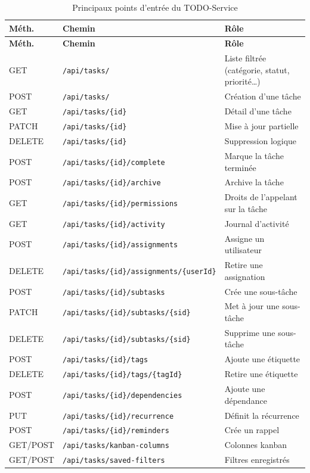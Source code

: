 \documentclass[11pt,a4paper,oneside]{report}
\newcommand{\code}[1]{\texttt{\small #1}}
\begin{document}
\begin{longtable}{@{}p{1.4cm}p{7.2cm}p{5.9cm}@{}}
\caption{Principaux points d'entrée du TODO-Service}\label{tab:ep-task}\\
\toprule
\textbf{Méth.} & \textbf{Chemin} & \textbf{Rôle} \\
\midrule
\endfirsthead
\toprule
\textbf{Méth.} & \textbf{Chemin} & \textbf{Rôle} \\
\midrule
\endhead
\bottomrule
\endlastfoot
GET & \code{/api/tasks/} & Liste filtrée (catégorie, statut, priorité…) \\
POST & \code{/api/tasks/} & Création d'une tâche \\
GET & \code{/api/tasks/\{id\}} & Détail d'une tâche \\
PATCH & \code{/api/tasks/\{id\}} & Mise à jour partielle \\
DELETE & \code{/api/tasks/\{id\}} & Suppression logique \\
POST & \code{/api/tasks/\{id\}/complete} & Marque la tâche terminée \\
POST & \code{/api/tasks/\{id\}/archive} & Archive la tâche \\
GET & \code{/api/tasks/\{id\}/permissions} & Droits de l'appelant sur la tâche \\
GET & \code{/api/tasks/\{id\}/activity} & Journal d'activité \\
POST & \code{/api/tasks/\{id\}/assignments} & Assigne un utilisateur \\
DELETE & \code{/api/tasks/\{id\}/assignments/\{userId\}} & Retire une assignation \\
POST & \code{/api/tasks/\{id\}/subtasks} & Crée une sous-tâche \\
PATCH & \code{/api/tasks/\{id\}/subtasks/\{sid\}} & Met à jour une sous-tâche \\
DELETE & \code{/api/tasks/\{id\}/subtasks/\{sid\}} & Supprime une sous-tâche \\
POST & \code{/api/tasks/\{id\}/tags} & Ajoute une étiquette \\
DELETE & \code{/api/tasks/\{id\}/tags/\{tagId\}} & Retire une étiquette \\
POST & \code{/api/tasks/\{id\}/dependencies} & Ajoute une dépendance \\
PUT & \code{/api/tasks/\{id\}/recurrence} & Définit la récurrence \\
POST & \code{/api/tasks/\{id\}/reminders} & Crée un rappel \\
GET/POST & \code{/api/tasks/kanban-columns} & Colonnes kanban \\
GET/POST & \code{/api/tasks/saved-filters} & Filtres enregistrés \\
\end{longtable}
\end{document}

